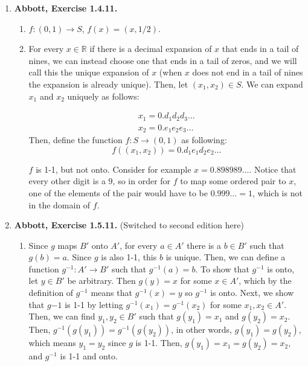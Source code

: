 \documentclass{article}
\newcommand{\R}{\mathbb{R}}
\newcommand{\exc}[2][Abbott]{\item \textbf{#1, Exercise #2.}}
\begin{document}
\begin{enumerate}
	\exc{1.4.11}
	\begin{enumerate}
		\item $f : (0,1) \rightarrow S$, $f(x) = (x, 1/2)$.
		      		      		      	      	      	      	              
		\item For every $x \in \R$ if there is a decimal expansion of $x$ that ends in a tail of nines, we can instead choose one that ends in a tail of zeros, and we will call this the unique expansion of $x$ (when $x$ does not end in a tail of nines the expansion is already unique). Then, let $(x_1, x_2) \in S$. We can expand $x_1$ and $x_2$ uniquely as follows:
		      		      		      	      	      	      	              
		      \begin{gather}
		      	\nonumber x_1 = 0.d_1 d_2 d_3 \dots \\
		      	\nonumber x_2 = 0.e_1 e_2 e_3 \dots
		      \end{gather}
		      Then, define the function $f : S \rightarrow (0, 1)$ as following: 
		      \begin{equation*}
		      	f((x_1, x_2)) = 0.d_1e_1d_2e_2 \dots
		      \end{equation*}
		      		      		      	      	      	      	             
		      $f$ is 1-1, but not onto. Consider for example $x = 0.898989\dots$. Notice that every other digit is a $9$, so in order for $f$ to map some ordered pair to $x$, one of the elements of the pair would have to be $0.999\dots = 1$, which is not in the domain of $f$.
	\end{enumerate}
				      	          
	\exc{1.5.11} (Switched to second edition here)
				      	          
	\begin{enumerate}
		\item Since $g$ maps $B'$ onto $A'$, for every $a \in A'$ there is a $b \in B'$ such that $g(b) = a$. Since $g$ is also 1-1, this $b$ is unique. Then, we can define a function $g^{-1} : A' \rightarrow B'$ such that $g^{-1}(a) = b$. To show that $g^{-1}$ is onto, let $y \in B'$ be arbitrary. Then $g(y) = x$ for some $x \in A'$, which by the definition of $g^{-1}$ means that $g^{-1}(x) = y$ so $g^{-1}$ is onto. Next, we show that $g{-1}$ is 1-1 by letting $g^{-1}(x_1) = g^{-1}(x_2)$ for some $x_1, x_2 \in A'$. Then, we can find $y_1, y_2 \in B'$ such that $g(y_1) = x_1$ and $g(y_2) = x_2$. Then, $g^{-1}(g(y_1)) = g^{-1}(g(y_2))$, in other words, $g(y_1) = g(y_2)$, which means $y_1 = y_2$ since $g$ is 1-1. Then, $g(y_1) = x_1 = g(y_2) = x_2$, and $g^{-1}$ is 1-1 and onto.
		      		      		      	      	      	      	              

\end{enumerate}
\end{enumerate}
\end{document}
